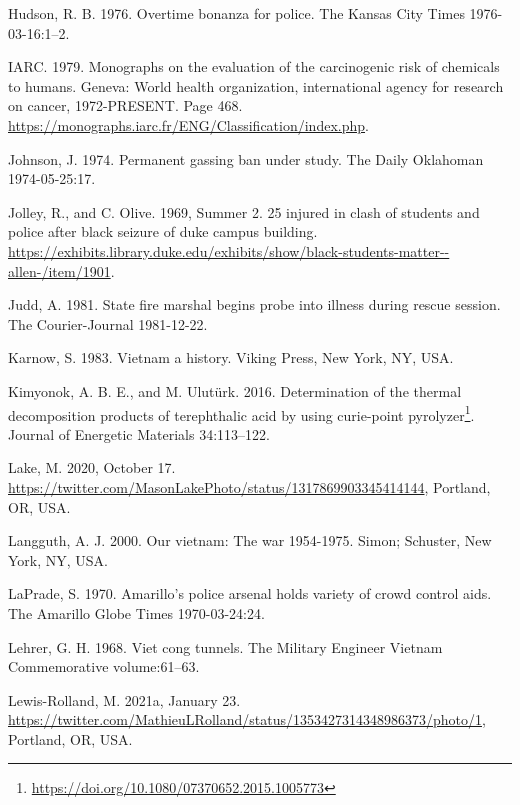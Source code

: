 \documentclass[
  11pt,
]{krantz}
\newlength{\cslhangindent}
\newlength{\cslentryspacingunit} %
\newenvironment{CSLReferences}[2] %
 {%
  \setlength{\parindent}{0pt}
  \ifodd #1
  \let\oldpar\par
  \def\par{\hangindent=\cslhangindent\oldpar}
  \fi
  \setlength{\parskip}{#2\cslentryspacingunit}
 }%
 {}
\renewcommand{\href}[2]{#2\footnote{\url{#1}}}
\begin{document}
\begin{CSLReferences}{1}{0}
\leavevmode{}%
Hudson, R. B. 1976. Overtime bonanza for police. The Kansas City Times 1976-03-16:1--2.

\leavevmode{}%
IARC. 1979. Monographs on the evaluation of the carcinogenic risk of chemicals to humans. Geneva: World health organization, international agency for research on cancer, 1972-PRESENT. Page 468. \url{https://monographs.iarc.fr/ENG/Classification/index.php}.

\leavevmode{}%
Johnson, J. 1974. Permanent gassing ban under study. The Daily Oklahoman 1974-05-25:17.

\leavevmode{}%
Jolley, R., and C. Olive. 1969, Summer 2. 25 injured in clash of students and police after black seizure of duke campus building. \url{https://exhibits.library.duke.edu/exhibits/show/black-students-matter--allen-/item/1901}.

\leavevmode{}%
Judd, A. 1981. State fire marshal begins probe into illness during rescue session. The Courier-Journal 1981-12-22.

\leavevmode{}%
Karnow, S. 1983. Vietnam a history. Viking Press, New York, NY, USA.

\leavevmode{}%
Kimyonok, A. B. E., and M. Ulutürk. 2016. \href{https://doi.org/10.1080/07370652.2015.1005773}{Determination of the thermal decomposition products of terephthalic acid by using curie-point pyrolyzer}. Journal of Energetic Materials 34:113--122.

\leavevmode{}%
Lake, M. 2020, October 17. \url{https://twitter.com/MasonLakePhoto/status/1317869903345414144}, Portland, OR, USA.

\leavevmode{}%
Langguth, A. J. 2000. Our vietnam: The war 1954-1975. Simon; Schuster, New York, NY, USA.

\leavevmode{}%
LaPrade, S. 1970. Amarillo's police arsenal holds variety of crowd control aids. The Amarillo Globe Times 1970-03-24:24.

\leavevmode{}%
Lehrer, G. H. 1968. Viet cong tunnels. The Military Engineer Vietnam Commemorative volume:61--63.

\leavevmode{}%
Lewis-Rolland, M. 2021a, January 23. \url{https://twitter.com/MathieuLRolland/status/1353427314348986373/photo/1}, Portland, OR, USA.


\end{CSLReferences}
\end{document}
